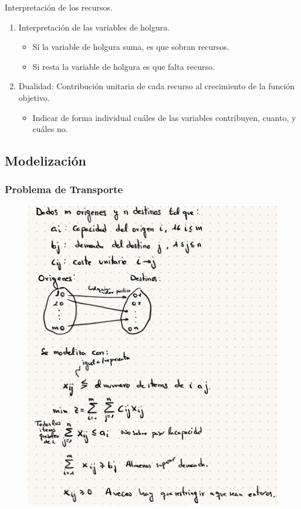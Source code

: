 \documentclass[12pt, twoside, openright]{report} %
\begin{document}
Interpretación de los recursos.

\begin{enumerate}
	\item Interpretación de las variables de holgura.
	\begin{itemize}
		\item Si la variable de holgura suma, es que sobran recursos.
		\item Si resta la variable de holgura es que falta recurso.
	\end{itemize}
	\item Dualidad: Contribución unitaria de cada recurso al crecimiento de
	la función objetivo.

	\begin{itemize}
	\item Indicar de forma individual cuáles de las variables contribuyen,
		cuanto, y cuáles no.
	\end{itemize}
\end{enumerate}
\pagebreak
\subsection{Modelización}

\subsubsection{Problema de Transporte}
\begin{figure}[H]
	{\includegraphics[scale=.25]{Untitled 15.png}}
\end{figure}
\end{document}
